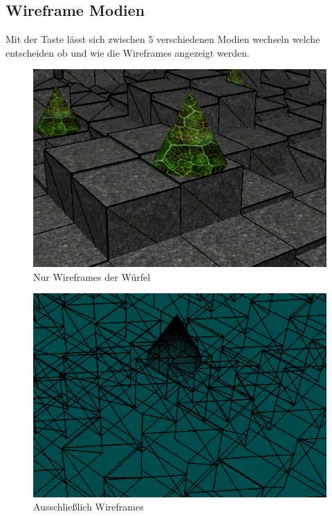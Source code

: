 \documentclass{article}
\begin{document}
\subsection{Wireframe Modien}
Mit der Taste  lässt sich zwischen 5 verschiedenen Modien wechseln welche entscheiden ob und wie
die Wireframes angezeigt werden.\\
\begin{minipage}{0.5\textwidth}
\begin{figure}[H]
    \includegraphics[scale=0.288]{wmode1.png}
    \caption{Nur Wireframes der Würfel}
\end{figure}
\end{minipage}
\begin{minipage}{0.5\textwidth}
\begin{figure}[H]
    \includegraphics[scale=0.370]{wmode2.png}
    \caption{Ausschließlich Wireframes}
\end{figure}
\end{minipage}
\end{document}
